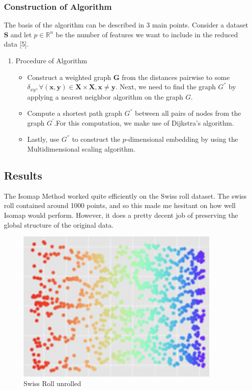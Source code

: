\documentclass[12pt]{article}
\begin{document}
\subsubsection{Construction of Algorithm}

\hspace{5mm}The basis of the algorithm can be described in 3 main points. Consider a dataset $\textbf{S}$ and let $p\in\mathbb{R}^n$ be the number of features we want to include in the reduced data [5].

\begin{enumerate}
    \item Procedure of Algorithm
    \begin{itemize}
        \item Construct a weighted graph \textbf{G} from the distances pairwise to some \newline$\delta_{xy},\forall (\textbf{x},\textbf{y})\in \textbf{X} \times \textbf{X},\textbf{x}\neq\textbf{y}.$ Next, we need to find the graph $G^{''}$ by applying a nearest neighbor algorithm on the graph $G$.
        \item Compute a shortest path graph $G^{''}$ between all pairs of nodes from the graph $G^'$.\newline For this computation, we make use of Dijkstra’s algorithm.
        \item Lastly, use $G^{''}$ to construct the $p$-dimensional embedding by using the Multidimensional scaling algorithm.
    \end{itemize}
\end{enumerate}

\hspace{5mm}

\subsection{Results}


\hspace{5mm}The Isomap Method worked quite efficiently on the Swiss roll dataset. The swiss roll contained around 1000 points, and so this made me hesitant on how well Isomap would perform. However, it does a pretty decent job of preserving the global structure of the original data.

\begin{figure}[h!]
    \centering
    \includegraphics[width=100mm]{swissrollunrolled.png}
    \caption{Swiss Roll unrolled}
    \label{fig:swissunrolled}
\end{figure}
\end{document}

